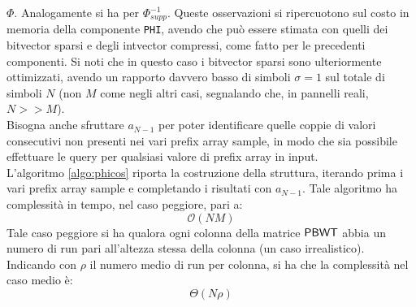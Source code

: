 $\varPhi$. Analogamente 
si ha per $\varPhi^{-1}_{supp}$.
Queste osservazioni si ripercuotono sul costo in memoria della componente
\texttt{PHI}, avendo che può essere stimata con quelli dei bitvector
sparsi e degli intvector compressi, come fatto per le precedenti componenti. Si
noti che in questo caso i bitvector sparsi sono ulteriormente
ottimizzati,
avendo un rapporto davvero basso di simboli $\sigma=1$ sul totale di
simboli $N$ (non $M$
come negli altri casi, segnalando che, in pannelli reali, $N>>M$).\\ 
Bisogna anche sfruttare $a_{N-1}$ per poter
identificare quelle coppie di valori consecutivi non presenti nei vari
prefix array sample, in modo che sia possibile effettuare le query per
qualsiasi valore di prefix array in input.\\
L'algoritmo \ref{algo:phicos} riporta la costruzione della struttura,
iterando prima i vari prefix array sample e completando i
risultati con $a_{N-1}$. Tale algoritmo ha complessità in tempo, nel caso
peggiore, pari a:
\begin{equation}
  \label{eq:phicos}
  \mathcal{O}(NM)
\end{equation}
Tale caso peggiore si ha qualora ogni colonna della matrice $\mbox{\rm {\sf PBWT}}$ abbia un
numero di 
run pari all'altezza stessa della colonna (un caso irrealistico). Indicando con
$\rho$ il numero medio 
di run per colonna, si ha che la complessità nel caso medio è:
\begin{equation}
  \label{eq:phicos2}
  \varTheta(N\rho)
\end{equation}
